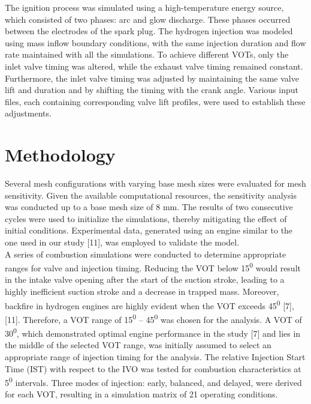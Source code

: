 \documentclass[conference]{IEEEtran}
\begin{document}
The ignition process was simulated using a high-temperature energy source, which consisted of two phases: arc and glow discharge. 
These phases occurred between the electrodes of the spark plug. 
The hydrogen injection was modeled using mass inflow boundary conditions, with the same injection duration and flow rate maintained with all the simulations. 
To achieve different VOTs, only the inlet valve timing was altered, while the exhaust valve timing remained constant. 
Furthermore, the inlet valve timing was adjusted by maintaining the same valve lift and duration and by shifting the timing with the crank angle. 
Various input files, each containing corresponding valve lift profiles, were used to establish these adjustments.


\section{Methodology}

Several mesh configurations with varying base mesh sizes were evaluated for mesh sensitivity. 
Given the available computational resources, the sensitivity analysis was conducted up to a base mesh size of 8 mm. 
The results of two consecutive cycles were used to initialize the simulations, thereby mitigating the effect of initial conditions. 
Experimental data, generated using an engine similar to the one used in our study [11], was employed to validate the model.\\

A series of combustion simulations were conducted to determine appropriate ranges for valve and injection timing. 
Reducing the VOT below 15\textsuperscript{0} would result in the intake valve opening after the start of the suction stroke, leading to a highly inefficient suction stroke and a decrease in trapped mass. 
Moreover, backfire in hydrogen engines are highly evident when the VOT exceeds 45\textsuperscript{0} [7], [11]. 
Therefore, a VOT range of 15\textsuperscript{0} – 45\textsuperscript{0} was chosen for the analysis. 
A VOT of 30\textsuperscript{0}, which demonstrated optimal engine performance in the study [7] and lies in the middle of the selected VOT range, was initially assumed to select an appropriate range of injection timing for the analysis. 
The relative Injection Start Time (IST) with respect to the IVO was tested for combustion characteristics at 5\textsuperscript{0} intervals. 
Three modes of injection: early, balanced, and delayed, were derived for each VOT, resulting in a simulation matrix of 21 operating conditions.\\
\end{document}
